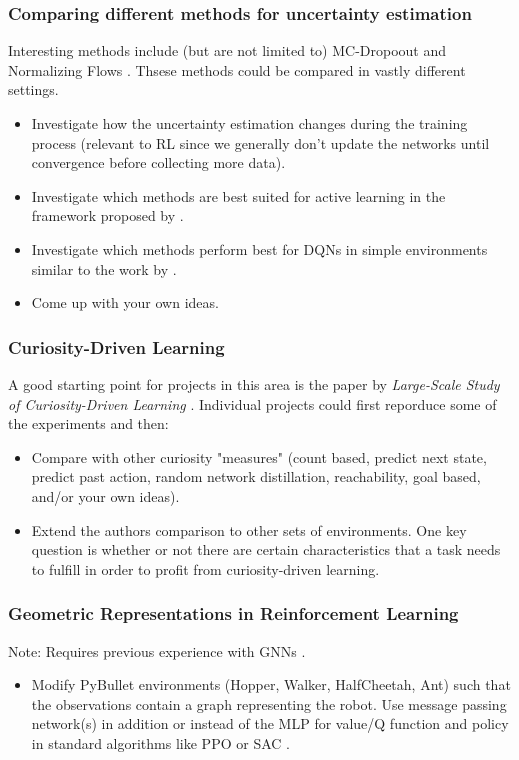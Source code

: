 \documentclass[a4paper]{article}
\begin{document}
\subsubsection{Comparing different methods for uncertainty estimation}
\label{sec:uncertainty-estimation}
Interesting methods include (but are not limited to) MC-Dropoout \cite{Gal2016} and Normalizing Flows \cite{louizos2017multiplicative}. Thsese methods could be compared in vastly different settings.
\begin{itemize}
    \item Investigate how the uncertainty estimation changes during the training process (relevant to RL since we generally don’t update the networks until convergence before collecting more data).
    \item Investigate which methods are best suited for active learning in the framework proposed by \cite{gal2017active}.
    \item Investigate which methods perform best for DQNs in simple environments similar to the work by \cite{touati2018randomized}.
    \item Come up with your own ideas.
\end{itemize}

\subsubsection{Curiosity-Driven Learning}
A good starting point for projects in this area is the paper by \textit{Large-Scale Study of Curiosity-Driven Learning} \cite{burda2018largescale}. Individual projects could first reporduce some of the experiments and then:
\begin{itemize}
    \item Compare with other curiosity "measures" (count based, predict next state, predict past action, random network distillation, reachability, goal based, and/or your own ideas).
    \item Extend the authors comparison to other sets of environments. One key question is whether or not there are certain characteristics that a task needs to fulfill in order to profit from curiosity-driven learning.
\end{itemize}

\subsubsection{Geometric Representations in Reinforcement Learning}
Note: Requires previous experience with GNNs \cite{kipf2016semisupervised}.
\begin{itemize}
    \item Modify PyBullet environments (Hopper, Walker, HalfCheetah, Ant) such that the observations contain a graph representing the robot. Use message passing network(s) in addition or instead of the MLP for value/Q function and policy in standard algorithms like PPO \cite{Schulman2017} or SAC \cite{Haarnoja2018a}.
\end{itemize}
\end{document}
